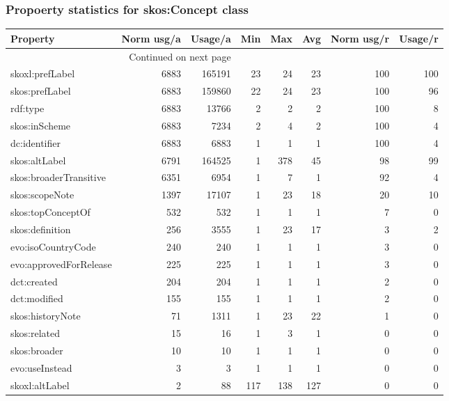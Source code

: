 \documentclass[10pt,a4paper,titlepage,final]{article}
\begin{document}
\subsubsection{Propoerty statistics for skos:Concept class}
\begin{longtable}{lrrrrrrr}
\toprule
               Property &  Norm usg/a &  Usage/a &  Min &  Max &  Avg &  Norm usg/r &  Usage/r \\
\midrule
\endhead
\midrule
\multicolumn{3}{r}{{Continued on next page}} \\
\midrule
\endfoot

\bottomrule
\endlastfoot
        skoxl:prefLabel &        6883 &   165191 &   23 &   24 &   23 &         100 &      100 \\
         skos:prefLabel &        6883 &   159860 &   22 &   24 &   23 &         100 &       96 \\
               rdf:type &        6883 &    13766 &    2 &    2 &    2 &         100 &        8 \\
          skos:inScheme &        6883 &     7234 &    2 &    4 &    2 &         100 &        4 \\
          dc:identifier &        6883 &     6883 &    1 &    1 &    1 &         100 &        4 \\
          skos:altLabel &        6791 &   164525 &    1 &  378 &   45 &          98 &       99 \\
 skos:broaderTransitive &        6351 &     6954 &    1 &    7 &    1 &          92 &        4 \\
         skos:scopeNote &        1397 &    17107 &    1 &   23 &   18 &          20 &       10 \\
      skos:topConceptOf &         532 &      532 &    1 &    1 &    1 &           7 &        0 \\
        skos:definition &         256 &     3555 &    1 &   23 &   17 &           3 &        2 \\
     evo:isoCountryCode &         240 &      240 &    1 &    1 &    1 &           3 &        0 \\
 evo:approvedForRelease &         225 &      225 &    1 &    1 &    1 &           3 &        0 \\
            dct:created &         204 &      204 &    1 &    1 &    1 &           2 &        0 \\
           dct:modified &         155 &      155 &    1 &    1 &    1 &           2 &        0 \\
       skos:historyNote &          71 &     1311 &    1 &   23 &   22 &           1 &        0 \\
           skos:related &          15 &       16 &    1 &    3 &    1 &           0 &        0 \\
           skos:broader &          10 &       10 &    1 &    1 &    1 &           0 &        0 \\
         evo:useInstead &           3 &        3 &    1 &    1 &    1 &           0 &        0 \\
         skoxl:altLabel &           2 &       88 &  117 &  138 &  127 &           0 &        0 \\
\end{longtable}
\end{document}
